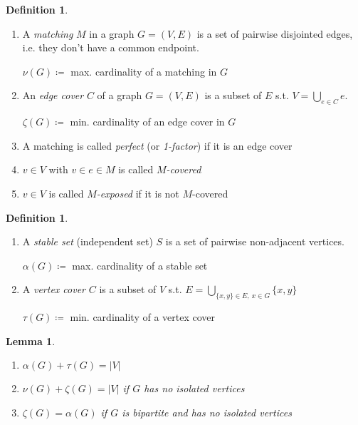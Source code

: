 \documentclass[11pt, a4paper]{article}
\newcommand{\abs}[1]{\left\lvert#1\right\rvert}
\newtheorem{lemma}[theorem]{Lemma}
\theoremstyle{remark}
\theoremstyle{definition}
\newtheorem{definition}[theorem]{Definition}
\begin{document}
\begin{definition}\
	\begin{enumerate}
		\item A \emph{matching} $M$ in a graph $G=(V,E)$ is a set of pairwise
		disjointed edges, i.e. they don't have a common endpoint.

		$\nu(G)\coloneqq$ max. cardinality of a matching in $G$

		\item An \emph{edge cover} $C$ of a graph $G=(V,E)$ is a subset of $E$ s.t.
		$V=\bigcup_{e\in C}e$.

		$\zeta(G) \coloneqq$ min. cardinality of an edge cover in $G$

		\item A matching is called \emph{perfect} (or \emph{1-factor}) if it is an
		edge cover

		\item $v\in V$ with $v\in e\in M$ is called \emph{$M$-covered}

		\item $v\in V$ is called \emph{$M$-exposed} if it is not
		$M$-covered
	\end{enumerate}
\end{definition}

\begin{definition}\
	\begin{enumerate}
		\item A \emph{stable set} (independent set) $S$ is a set of pairwise
		non-adjacent vertices.

		$\alpha(G)\coloneqq$ max. cardinality of a stable set

		\item A \emph{vertex cover} $C$ is a subset of $V$ s.t.
		$E=\bigcup_{\{x,y\}\in E,\ x\in G}\{x,y\}$

		$\tau(G)\coloneqq$ min. cardinality of a vertex cover
	\end{enumerate}
\end{definition}

\begin{lemma}\
	\begin{enumerate}
		\item $\alpha(G)+\tau(G) = \abs{V}$
		\item $\nu(G) + \zeta(G) = \abs{V}$ if $G$ has no isolated vertices
		\item $\zeta(G)=\alpha(G)$ if $G$ is bipartite and has no isolated
		vertices
	\end{enumerate}
\end{lemma}
\end{document}
